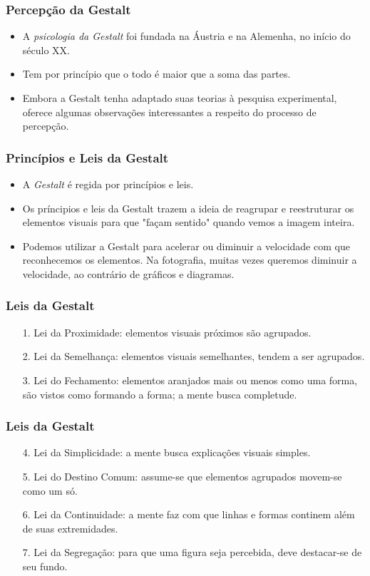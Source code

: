 \begin{frame}
    \frametitle{Percepção da Gestalt}
    \begin{itemize}
      \item A \textit{psicologia da Gestalt} foi fundada na Áustria e na Alemenha,
      no início do século XX.
      \item Tem por princípio que o todo é maior que a soma das partes.
      \item Embora a Gestalt tenha adaptado suas teorias à pesquisa experimental,
      oferece algumas observações interessantes a respeito do processo de percepção.
    \end{itemize}
\end{frame}

\begin{frame}
    \frametitle{Princípios e Leis da Gestalt}
    \begin{itemize}
      \item A \textit{Gestalt} é regida por princípios e leis.
      \item Os príncipios e leis da Gestalt trazem a ideia de reagrupar e reestruturar
      os elementos visuais para que "façam sentido" quando vemos a imagem inteira.
      \item Podemos utilizar a Gestalt para acelerar ou diminuir a velocidade com que
      reconhecemos os elementos. Na fotografia, muitas vezes queremos diminuir a
      velocidade, ao contrário de gráficos e diagramas.
    \end{itemize}
\end{frame}

\begin{frame}
    \frametitle{Leis da Gestalt}
    \begin{itemize}
      \item[1.] Lei da Proximidade: elementos visuais próximos são agrupados.
      \item[2.] Lei da Semelhança: elementos visuais semelhantes, tendem a ser agrupados.
      \item[3.] Lei do Fechamento: elementos aranjados mais ou menos como uma forma,
      são vistos como formando a forma; a mente busca completude.
    \end{itemize}
\end{frame}

\begin{frame}
    \frametitle{Leis da Gestalt}
    \begin{itemize}
      \item[4.] Lei da Simplicidade: a mente busca explicações visuais simples.
      \item[5.] Lei do Destino Comum: assume-se que elementos agrupados movem-se como um só.
      \item[6.] Lei da Continuidade: a mente faz com que linhas e formas continem além de suas extremidades.
      \item[7.] Lei da Segregação: para que uma figura seja percebida, deve destacar-se de seu fundo.
    \end{itemize}
\end{frame}


